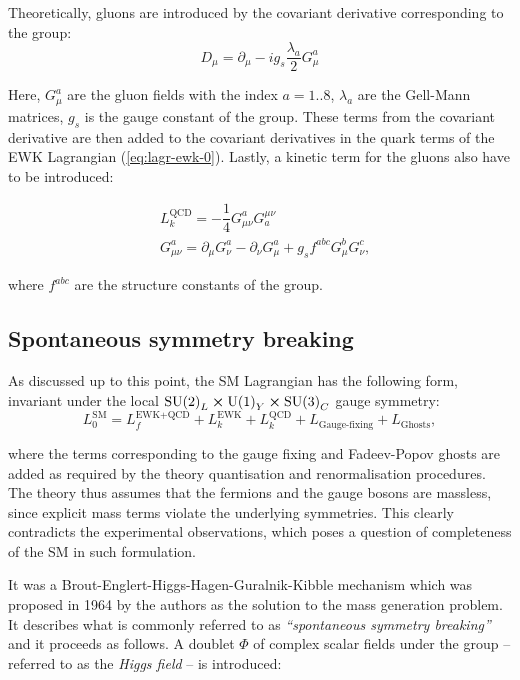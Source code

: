 Theoretically, gluons are introduced by the covariant derivative corresponding to the \suthr group:
\begin{equation}
    D_\mu = \partial_\mu - ig_s\dfrac{\lambda_a}{2}G_\mu^a
\end{equation}

Here, $G_\mu^a$ are the gluon fields with the index $a=1..8$, $\lambda_a$ are the Gell-Mann matrices, $g_s$ is the gauge constant of the \suthr group. These terms from the covariant derivative are then added to the covariant derivatives in the quark terms of the EWK Lagrangian (\ref{eq:lagr-ewk-0}). Lastly, a kinetic term for the gluons also have to be introduced:

\begin{align}
    &L_k^\text{QCD} = -\dfrac{1}{4}G_{\mu\nu}^aG^{\mu\nu}_a\\
    &G_{\mu\nu}^a = \partial_\mu G_\nu^a - \partial_\nu G_\mu^a + g_s f^{abc}G_\mu^b G_\nu^c,
\end{align}

where $f^{abc}$ are the structure constants of the \suthr group.

\subsection{Spontaneous symmetry breaking}\label{sec:break}

As discussed up to this point, the SM Lagrangian has the following form, invariant under the local $\text{SU(2)}_L \cross \text{U(1)}_Y \cross \text{SU(3)}_C$ gauge symmetry:
\begin{equation}
    L_0^\text{SM} = L_f^\text{EWK+QCD} + L_k^\text{EWK} + L_k^\text{QCD} + L_\text{Gauge-fixing} + L_\text{Ghosts},
\end{equation}

where the terms corresponding to the gauge fixing and Fadeev-Popov ghosts are added as required by the theory quantisation and renormalisation procedures. The theory thus assumes that the fermions and the gauge bosons are massless, since explicit mass terms violate the underlying symmetries. This clearly contradicts the experimental observations, which poses a question of completeness of the SM in such formulation.

It was a Brout-Englert-Higgs-Hagen-Guralnik-Kibble
mechanism which was proposed in 1964 by the authors as the solution to the mass generation problem. It describes what is commonly referred to as \textit{\enquote{spontaneous symmetry breaking}} and it proceeds as follows. A doublet $\Phi$ of complex scalar fields under the \sutwo group -- referred to as the \textit{Higgs field} -- is introduced:

